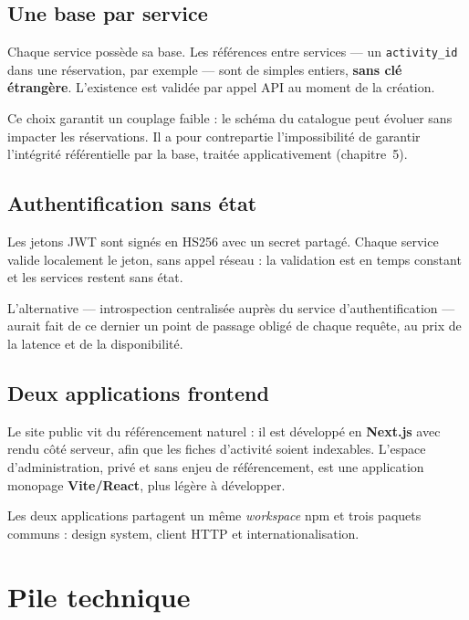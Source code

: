 \documentclass[11pt,a4paper]{report}
\begin{document}
\subsection{Une base par service}

Chaque service possède sa base. Les références entre services — un
\texttt{activity\_id} dans une réservation, par exemple — sont de simples
entiers, \textbf{sans clé étrangère}. L'existence est validée par appel API au
moment de la création.

Ce choix garantit un couplage faible : le schéma du catalogue peut évoluer sans
impacter les réservations. Il a pour contrepartie l'impossibilité de garantir
l'intégrité référentielle par la base, traitée applicativement (chapitre~5).

\subsection{Authentification sans état}

Les jetons JWT sont signés en HS256 avec un secret partagé. Chaque service
valide localement le jeton, sans appel réseau : la validation est en temps
constant et les services restent sans état.

L'alternative — introspection centralisée auprès du service d'authentification —
aurait fait de ce dernier un point de passage obligé de chaque requête, au prix
de la latence et de la disponibilité.

\subsection{Deux applications frontend}

Le site public vit du référencement naturel : il est développé en
\textbf{Next.js} avec rendu côté serveur, afin que les fiches d'activité soient
indexables. L'espace d'administration, privé et sans enjeu de référencement, est
une application monopage \textbf{Vite/React}, plus légère à développer.

Les deux applications partagent un même \emph{workspace} npm et trois paquets
communs : design system, client HTTP et internationalisation.

\section{Pile technique}
\end{document}
